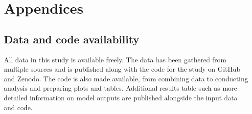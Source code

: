 \documentclass[unnumsec,webpdf,modern,medium]{oup-authoring-template}
\begin{document}
\newpage









\renewcommand{\thesection}{\Alph{section}}
\newpage 

\section{Appendices}












\subsection{Data and code availability}
\label{appendix_supp_data_availability}

All data in this study is available freely. The data has been gathered from multiple sources and is published along with the code for the study on GitHub and Zenodo. The code is also made available, from combining data to conducting analysis and preparing plots and tables. Additional results table such as more detailed information on model outputs are published alongside the input data and code.
\end{document}
